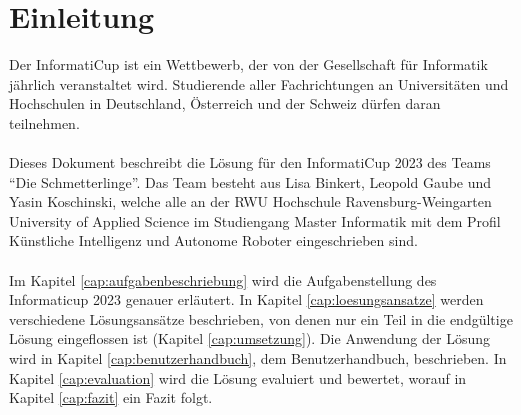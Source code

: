 \section{Einleitung}
Der InformatiCup ist ein Wettbewerb, der von der Gesellschaft für Informatik jährlich veranstaltet wird. Studierende aller Fachrichtungen an Universitäten und Hochschulen in Deutschland, Österreich und der Schweiz dürfen daran teilnehmen.
\\\\
Dieses Dokument beschreibt die Lösung für den InformatiCup 2023 des Teams “Die Schmetterlinge”. Das Team besteht aus Lisa Binkert, Leopold Gaube und Yasin Koschinski, welche alle an der RWU Hochschule Ravensburg-Weingarten University of Applied Science im Studiengang Master Informatik mit dem Profil Künstliche Intelligenz und Autonome Roboter eingeschrieben sind.
\\\\
Im Kapitel \ref{cap:aufgabenbeschriebung} wird die Aufgabenstellung des Informaticup 2023 genauer erläutert. In Kapitel \ref{cap:loesungsansatze} werden verschiedene Lösungsansätze beschrieben, von denen nur ein Teil in die endgültige Lösung eingeflossen ist (Kapitel \ref{cap:umsetzung}). Die Anwendung der Lösung wird in Kapitel \ref{cap:benutzerhandbuch}, dem Benutzerhandbuch, beschrieben. In Kapitel \ref{cap:evaluation} wird die Lösung evaluiert und bewertet, worauf in Kapitel \ref{cap:fazit} ein Fazit folgt.
